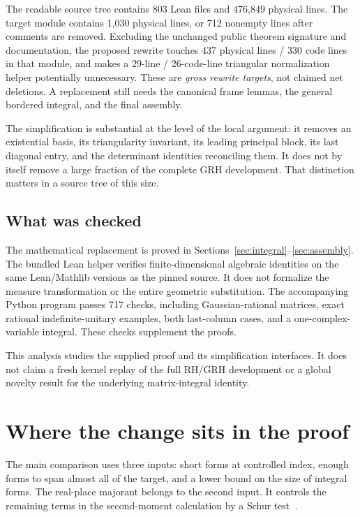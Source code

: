 \documentclass[11pt,letterpaper]{article}
\theoremstyle{remark}
\begin{document}
The readable source tree contains 803 Lean files and 476,849 physical lines.
The target module contains 1,030 physical lines, or 712 nonempty lines after
comments are removed. Excluding the unchanged public theorem signature and
documentation, the proposed rewrite touches 437 physical lines / 330
code lines in that module, and makes a 29-line / 26-code-line triangular
normalization helper potentially unnecessary. These are \emph{gross rewrite
targets}, not claimed net deletions. A replacement still needs the canonical
frame lemmas, the general bordered integral, and the final assembly.

The simplification is substantial at the level of the local argument: it removes
an existential basis, its triangularity invariant, its leading principal block,
its last diagonal entry, and the determinant identities reconciling them. It does
not by itself remove a large fraction of the complete GRH development. That
distinction matters in a source tree of this size.

\subsection{What was checked}

The mathematical replacement is proved in Sections~\ref{sec:integral}--\ref{sec:assembly}.
The bundled Lean helper verifies finite-dimensional algebraic identities on the
same Lean/Mathlib versions as the pinned source. It does not formalize the
measure transformation or the entire geometric substitution. The accompanying
Python program passes 717 checks, including Gaussian-rational matrices,
exact rational indefinite-unitary examples, both last-column cases, and a
one-complex-variable integral. These checks supplement the proofs.

This analysis studies the supplied proof and its simplification interfaces. It
does not claim a fresh kernel replay of the full RH/GRH development or a global
novelty result for the underlying matrix-integral identity.

\section{Where the change sits in the proof}

The main comparison uses three inputs: short forms at controlled index, enough
forms to span almost all of the target, and a lower bound on the size of integral
forms. The real-place majorant belongs to the second input. It controls the
remaining terms in the second-moment calculation by a Schur test~\cite{guide,consumer}.
\end{document}

